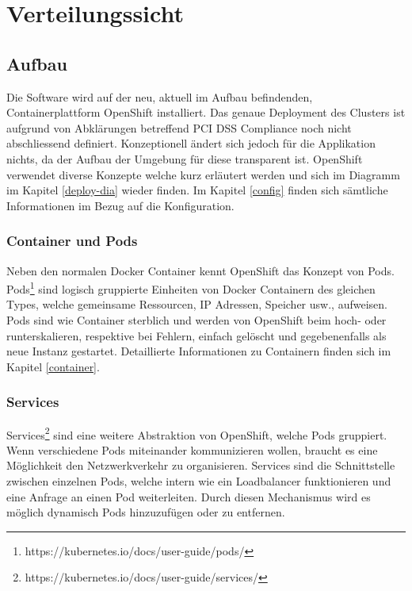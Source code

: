 \graphicspath{{./images/}}

\chapter{Verteilungssicht}
\label{deploy}

\section{Aufbau}
Die Software wird auf der neu, aktuell im Aufbau befindenden, Containerplattform OpenShift installiert. Das genaue Deployment des Clusters ist aufgrund von Abklärungen betreffend PCI DSS Compliance noch nicht abschliessend definiert. Konzeptionell ändert sich jedoch für die Applikation nichts, da der Aufbau der Umgebung für diese transparent ist.
OpenShift verwendet diverse Konzepte welche kurz erläutert werden und sich im Diagramm im Kapitel \ref{deploy-dia} wieder finden. Im Kapitel \ref{config} finden sich sämtliche Informationen im Bezug auf die Konfiguration.

\subsection{Container und Pods}

Neben den normalen Docker Container kennt OpenShift das Konzept von Pods. Pods\footnote{https://kubernetes.io/docs/user-guide/pods/} sind logisch gruppierte Einheiten von Docker Containern des gleichen Types, welche gemeinsame Ressourcen, IP Adressen, Speicher usw.,  aufweisen. Pods sind wie Container sterblich und werden von OpenShift beim hoch- oder runterskalieren, respektive bei Fehlern, einfach gelöscht und gegebenenfalls als neue Instanz gestartet. Detaillierte Informationen zu Containern finden sich im Kapitel \ref{container}.

\subsection{Services}

Services\footnote{https://kubernetes.io/docs/user-guide/services/} sind eine weitere Abstraktion von OpenShift, welche Pods gruppiert. Wenn verschiedene Pods miteinander kommunizieren wollen, braucht es eine Möglichkeit den Netzwerkverkehr zu organisieren. Services sind die Schnittstelle zwischen einzelnen Pods, welche intern wie ein Loadbalancer funktionieren und eine Anfrage an einen Pod weiterleiten. Durch diesen Mechanismus wird es möglich dynamisch Pods hinzuzufügen oder zu entfernen.


